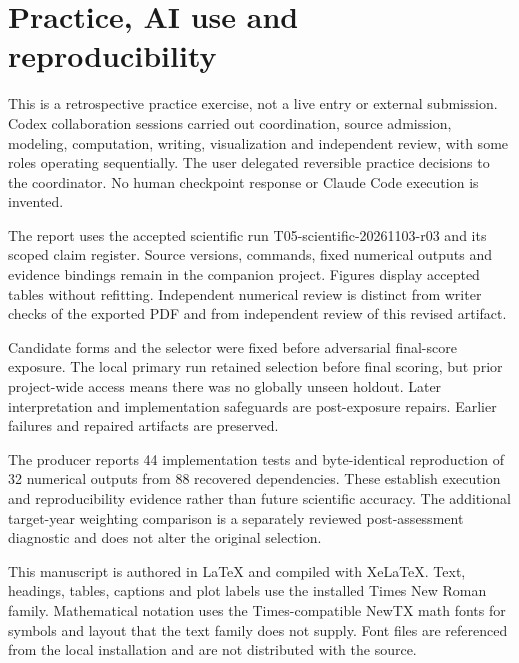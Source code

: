 \documentclass[11pt,a4paper]{article}
\newcommand{\p}[2]{#2\par}
\begin{document}
\section*{Practice, AI use and reproducibility}
\p{DIS01}{This is a retrospective practice exercise, not a live entry or external submission. Codex collaboration sessions carried out coordination, source admission, modeling, computation, writing, visualization and independent review, with some roles operating sequentially. The user delegated reversible practice decisions to the coordinator. No human checkpoint response or Claude Code execution is invented.}
\p{DIS02}{The report uses the accepted scientific run T05-scientific-20261103-r03 and its scoped claim register. Source versions, commands, fixed numerical outputs and evidence bindings remain in the companion project. Figures display accepted tables without refitting. Independent numerical review is distinct from writer checks of the exported PDF and from independent review of this revised artifact.}
\p{DIS03}{Candidate forms and the selector were fixed before adversarial final-score exposure. The local primary run retained selection before final scoring, but prior project-wide access means there was no globally unseen holdout. Later interpretation and implementation safeguards are post-exposure repairs. Earlier failures and repaired artifacts are preserved.}
\p{DIS04}{The producer reports 44 implementation tests and byte-identical reproduction of 32 numerical outputs from 88 recovered dependencies. These establish execution and reproducibility evidence rather than future scientific accuracy. The additional target-year weighting comparison is a separately reviewed post-assessment diagnostic and does not alter the original selection.}
\p{DIS05}{This manuscript is authored in LaTeX and compiled with XeLaTeX. Text, headings, tables, captions and plot labels use the installed Times New Roman family. Mathematical notation uses the Times-compatible NewTX math fonts for symbols and layout that the text family does not supply. Font files are referenced from the local installation and are not distributed with the source.}
\end{document}
